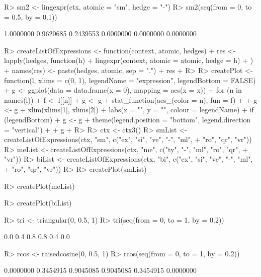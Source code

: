 \documentclass{article}\usepackage[]{graphicx}\usepackage[]{color}
\begin{document}
\begin{Schunk}
% --begin: "emptyhedge2"
\begin{Sinput}
R> sm2 <- lingexpr(ctx, atomic = "sm", hedge = "-")
R> sm2(seq(from = 0, to = 0.5, by = 0.1))
\end{Sinput}
\begin{Soutput}
[1] 1.0000000 0.9620685 0.2439553 0.0000000 0.0000000 0.0000000
\end{Soutput}
%
% --end: "emptyhedge2"
\end{Schunk}

\begin{Schunk}
\begin{Sinput}
R> createListOfExpressions <- function(context, atomic, hedges) {
+      res <- lapply(hedges, function(h) {
+          lingexpr(context, atomic = atomic, hedge = h)
+      })
+      names(res) <- paste(hedges, atomic, sep = ".")
+      res
+  }
R> 
R> createPlot <- function(l, xlims = c(0, 1), legendName = "expression", legendBottom = FALSE) {
+      g <- ggplot(data = data.frame(x = 0), mapping = aes(x = x))
+      for (n in names(l)) {
+          f <- l[[n]]
+          g <- g + stat_function(aes_(color = n), fun = f)
+      }
+      g <- g + xlim(xlims[1], xlims[2]) + labs(x = "", y = "", colour = legendName)
+      if (legendBottom) {
+          g <- g + theme(legend.position = "bottom", legend.direction = "vertical")
+      }
+      g
+  }
R> 
R> ctx <- ctx3()
R> smList <- createListOfExpressions(ctx, "sm", c("ex", "si", "ve", "-", "ml", 
+      "ro", "qr", "vr"))
R> meList <- createListOfExpressions(ctx, "me", c("ty", "-", "ml", "ro", "qr", 
+      "vr"))
R> biList <- createListOfExpressions(ctx, "bi", c("ex", "si", "ve", "-", "ml", 
+      "ro", "qr", "vr"))
R> 
R> createPlot(smList)
\end{Sinput}
\end{Schunk}

\begin{Schunk}
\begin{Sinput}
R> createPlot(meList)
\end{Sinput}
\end{Schunk}

\begin{Schunk}
\begin{Sinput}
R> createPlot(biList)
\end{Sinput}
\end{Schunk}

\begin{Schunk}
% --begin: "triangular"
\begin{Sinput}
R> tri <- triangular(0, 0.5, 1)
R> tri(seq(from = 0, to = 1, by = 0.2))
\end{Sinput}
\begin{Soutput}
[1] 0.0 0.4 0.8 0.8 0.4 0.0
\end{Soutput}
\begin{Sinput}
R> rcos <- raisedcosine(0, 0.5, 1)
R> rcos(seq(from = 0, to = 1, by = 0.2))
\end{Sinput}
\begin{Soutput}
[1] 0.0000000 0.3454915 0.9045085 0.9045085 0.3454915 0.0000000
\end{Soutput}
%
% --end: "triangular"
\end{Schunk}
\end{document}
